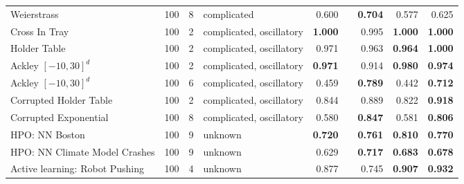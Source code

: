 \begin{table*}[t]
{\begin{tabular}{lrrlrr|rrr}
            Weierstrass                    & 100   & 8   & complicated                    & 0.600                  &                               & \textbf{0.704}                  & 0.577                             & 0.625                   \\
            Cross In Tray                  & 100   & 2   & complicated, oscillatory       & \textbf{1.000}         &                               & 0.995                           & \textbf{1.000}                    & \textbf{1.000}          \\
            Holder Table                   & 100   & 2   & complicated, oscillatory       & 0.971                  &                               & 0.963                           & \textbf{0.964}                    & \textbf{1.000}          \\
            Ackley $[-10, 30]^d$           & 100   & 2   & complicated, oscillatory       & \textbf{0.971}         &                               & 0.914                           & \textbf{0.980}                    & \textbf{0.974}          \\
            Ackley $[-10, 30]^d$           & 100   & 6   & complicated, oscillatory       & 0.459                  &                               & \textbf{0.789}                  & 0.442                             & \textbf{0.712}          \\
            Corrupted Holder Table         & 100   & 2   & complicated, oscillatory       & 0.844                  &                               & 0.889                           & 0.822                             & \textbf{0.918}          \\
            Corrupted Exponential          & 100   & 8   & complicated, oscillatory       & 0.580                  &                               & \textbf{0.847}                  & 0.581                             & \textbf{0.806}          \\
            \midrule
            HPO: NN Boston                 & 100   & 9   & unknown                        & \textbf{0.720}         &                               & \textbf{0.761}                  & \textbf{0.810}                    & \textbf{0.770}          \\
            HPO: NN Climate Model Crashes  & 100   & 9   & unknown                        & 0.629                  &                               & \textbf{0.717}                  & \textbf{0.683}                    & \textbf{0.678}          \\
            Active learning: Robot Pushing & 100   & 4   & unknown                        & 0.877                  &                               & 0.745                           & \textbf{0.907}                    & \textbf{0.932}          \\
            \bottomrule
        \end{tabular}
    }
    \medskip
\end{table*}

